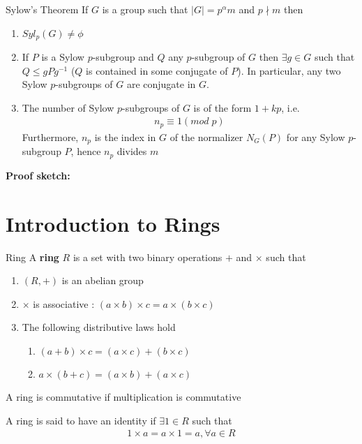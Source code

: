 \documentclass[titlepage, 12pt]{book}
\begin{document}
\begin{theorem}{Sylow's Theorem}{}
    If $G$ is a group such that $|G| = p^\alpha m$ and $p\nmid m$ then
    \begin{enumerate}
        \item $Syl_p(G)\neq\phi$
        \item If $P$ is a Sylow $p$-subgroup and $Q$ any $p$-subgroup of $G$
            then $\exists g\in G$ such that $Q\leq gPg^{-1}$ ($Q$ is contained
            in some conjugate of $P$). In particular, any two Sylow
            $p$-subgroups of $G$ are conjugate in $G$.
        \item The number of Sylow $p$-subgroups of $G$ is of the form $1+kp$,
            i.e.
            \begin{gather*}
                n_p\equiv 1(mod\; p)
            \end{gather*}
            Furthermore, $n_p$ is the index in $G$ of the normalizer $N_G(P)$
            for any Sylow $p$-subgroup $P$, hence $n_p$ divides $m$
    \end{enumerate}
\end{theorem}
\textbf{Proof sketch:}

\chapter{Introduction to Rings}
\begin{definition}{Ring}{}
    A \textbf{ring} $R$ is a set with two binary operations $+$ and $\times$
    such that
    \begin{enumerate}
        \item $(R, +)$ is an abelian group
        \item $\times$ is associative : $(a\times b)\times c = a\times (b\times
            c)$
        \item The following distributive laws hold
            \begin{enumerate}
                \item $(a+b)\times c = (a\times c) + (b\times c)$
                \item $a\times (b+c) = (a\times b) + (a\times c)$
            \end{enumerate}
    \end{enumerate}
\end{definition}

A ring is commutative if multiplication is commutative

A ring is said to have an identity if $\exists 1\in R$ such that
\begin{gather*}
    1\times a = a\times 1 = a, \forall a\in R
\end{gather*}
\end{document}
